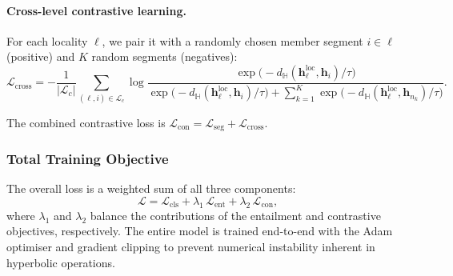 \paragraph{Cross-level contrastive learning.}
For each locality $\ell$, we pair it with a randomly chosen member segment $i \in \ell$ (positive) and $K$ random segments (negatives):
\begin{equation}\label{eq:loss_cross_cl}
  \mathcal{L}_{\text{cross}}
  = -\frac{1}{|\mathcal{L}_c|}
    \sum_{(\ell, i) \in \mathcal{L}_c}
    \log \frac{
      \exp\!\bigl(-d_{\mathbb{H}}(\mathbf{h}_\ell^{\text{loc}}, \mathbf{h}_i) / \tau\bigr)
    }{
      \exp\!\bigl(-d_{\mathbb{H}}(\mathbf{h}_\ell^{\text{loc}}, \mathbf{h}_i) / \tau\bigr)
      + \sum_{k=1}^{K} \exp\!\bigl(-d_{\mathbb{H}}(\mathbf{h}_\ell^{\text{loc}}, \mathbf{h}_{n_k}) / \tau\bigr)
    }.
\end{equation}

The combined contrastive loss is $\mathcal{L}_{\text{con}} = \mathcal{L}_{\text{seg}} + \mathcal{L}_{\text{cross}}$.

\subsubsection{Total Training Objective}\label{subsubsec:total_loss}

The overall loss is a weighted sum of all three components:
\begin{equation}\label{eq:total_loss}
  \mathcal{L}
  = \mathcal{L}_{\text{cls}}
  + \lambda_1\,\mathcal{L}_{\text{ent}}
  + \lambda_2\,\mathcal{L}_{\text{con}},
\end{equation}
where $\lambda_1$ and $\lambda_2$ balance the contributions of the entailment and contrastive objectives, respectively.
The entire model is trained end-to-end with the Adam optimiser and gradient clipping to prevent numerical instability inherent in hyperbolic operations.
